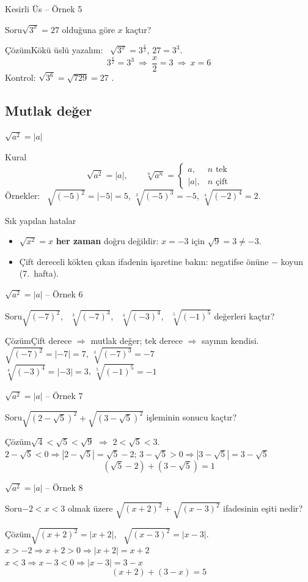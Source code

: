 \documentclass[aspectratio=169,11pt,handout]{beamer}
\newcommand{\soru}[3]{%
\begin{frame}{#1}
  \begin{block}{Soru}\large #2\end{block}
  \pause
  \begin{exampleblock}{Çözüm}\large #3\end{exampleblock}
\end{frame}}
\begin{document}
\soru{Kesirli Üs -- Örnek 5}
{\(\sqrt{3^x}=27\) olduğuna göre \(x\) kaçtır?}
{Kökü üslü yazalım: \ \(\sqrt{3^x}=3^{\frac{x}{2}}\), \quad \(27=3^3\).
\[3^{\frac{x}{2}}=3^3\ \Rightarrow\ \frac{x}{2}=3\ \Rightarrow\ x=6\]
Kontrol: \(\sqrt{3^6}=\sqrt{729}=27\) \checkmark.}

\subsection{Mutlak değer}
\begin{frame}{\(\sqrt{a^2}=|a|\)}
\begin{block}{Kural}
\[\sqrt{a^2}=|a|,\qquad \sqrt[n]{a^n}=\begin{cases}a, & n \text{ tek}\\ |a|, & n \text{ çift}\end{cases}\]
Örnekler: \ \(\sqrt{(-5)^2}=|-5|=5\), \quad \(\sqrt[3]{(-5)^3}=-5\), \quad \(\sqrt[4]{(-2)^4}=2\).
\end{block}
\begin{alertblock}{Sık yapılan hatalar}
\begin{itemize}
\item \(\sqrt{x^2}=x\) \textbf{her zaman} doğru değildir: \(x=-3\) için \(\sqrt{9}=3\neq -3\).
\item Çift dereceli kökten çıkan ifadenin işaretine bakın: negatifse önüne \(-\) koyun (7.~hafta).
\end{itemize}
\end{alertblock}
\end{frame}

\soru{\(\sqrt{a^2}=|a|\) -- Örnek 6}
{\(\sqrt{(-7)^2}\), \ \(\sqrt[3]{(-7)^3}\), \ \(\sqrt[4]{(-3)^4}\), \ \(\sqrt[5]{(-1)^5}\) değerleri kaçtır?}
{Çift derece \(\Rightarrow\) mutlak değer; tek derece \(\Rightarrow\) sayının kendisi.\\[4pt]
\(\sqrt{(-7)^2}=|-7|=7\), \qquad \(\sqrt[3]{(-7)^3}=-7\)\\[4pt]
\(\sqrt[4]{(-3)^4}=|-3|=3\), \qquad \(\sqrt[5]{(-1)^5}=-1\)}

\soru{\(\sqrt{a^2}=|a|\) -- Örnek 7}
{\(\sqrt{(2-\sqrt5)^2}+\sqrt{(3-\sqrt5)^2}\) işleminin sonucu kaçtır?}
{\(\sqrt4<\sqrt5<\sqrt9\) \(\Rightarrow\) \(2<\sqrt5<3\).\\[3pt]
\(2-\sqrt5<0\Rightarrow |2-\sqrt5|=\sqrt5-2\); \qquad \(3-\sqrt5>0\Rightarrow |3-\sqrt5|=3-\sqrt5\)
\[(\sqrt5-2)+(3-\sqrt5)=1\]}

\soru{\(\sqrt{a^2}=|a|\) -- Örnek 8}
{\(-2<x<3\) olmak üzere \(\sqrt{(x+2)^2}+\sqrt{(x-3)^2}\) ifadesinin eşiti nedir?}
{\(\sqrt{(x+2)^2}=|x+2|\), \ \(\sqrt{(x-3)^2}=|x-3|\).\\[3pt]
\(x>-2\Rightarrow x+2>0\Rightarrow |x+2|=x+2\)\\
\(x<3\Rightarrow x-3<0\Rightarrow |x-3|=3-x\)
\[(x+2)+(3-x)=5\]}
\end{document}
